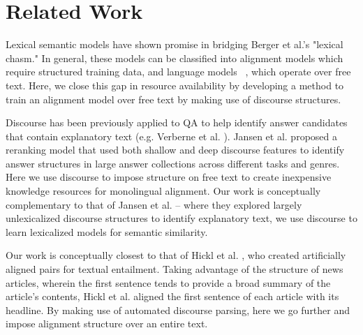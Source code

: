 
\section{Related Work}
\label{sec:related work}


Lexical semantic models have shown promise in bridging Berger et al.'s \citeyear{Berger:00} "lexical chasm."  In general, these models can be classified into alignment models \cite{echihabi2003noisy,Soricut:06,Riezler:etal:2007,Surdeanu:11,yao2013} which require structured training data, and language models ~\cite{jansen14,sultan-etal:2014:TACL,yih13}, which operate over free text.  Here, we close this gap in resource availability by developing a method to train an alignment model over free text by making use of discourse structures. 

  
  

Discourse has been previously applied to QA to help identify answer candidates that contain explanatory text (e.g. Verberne et al. \citeyear{Verberne:2007}).
Jansen et al. \citeyear{jansen14} proposed a reranking model that used both shallow and deep discourse features to identify answer structures in large answer collections across different tasks and genres.  Here we use discourse to impose structure on free text to create inexpensive knowledge resources for monolingual alignment. Our work is conceptually complementary to that of Jansen et al. -- where they explored largely unlexicalized discourse structures to identify explanatory text, we use discourse to learn lexicalized models for semantic similarity.

Our work is conceptually closest to that of Hickl et al. \citeyear{hickl2006recognizing}, who created artificially aligned pairs for textual entailment.  Taking advantage of the structure of news articles, wherein the first sentence tends to provide a broad summary of the article's contents, Hickl et al. aligned the first sentence of each article with its headline.  By making use of automated discourse parsing, here we go further and impose alignment structure over an entire text.



